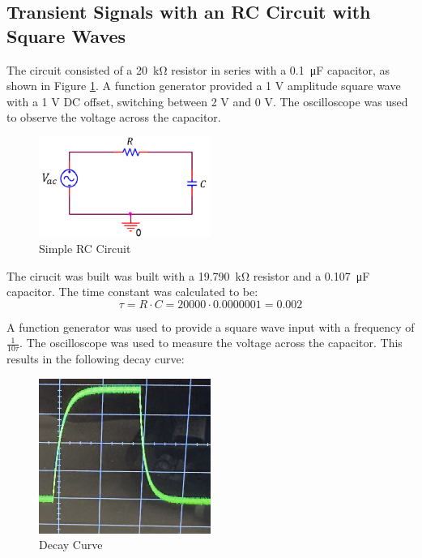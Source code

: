 \documentclass[12pt]{article}
\begin{document}
\subsection{Transient Signals with an RC Circuit with Square Waves} \label{subsec:part 1}
The circuit consisted of a \SI{20}{\kilo\ohm} resistor in series with a \SI{0.1}{\micro\farad} capacitor, as
shown in Figure \ref{fig:simpleRCCircuit}. A function generator provided a 1 V amplitude square wave
with a 1 V DC offset, switching between 2 V and 0 V. The oscilloscope was used
to observe the voltage across the capacitor.

\begin{figure}[H]
	\centering
	\includegraphics[width=0.5\textwidth]{SimpleRCCircuit.png}
	\caption{Simple RC Circuit}
	\label{fig:simpleRCCircuit}
\end{figure}

The cirucit was built was built with a \SI{19.790}{\kilo\ohm} resistor 
and a \SI{0.107}{\micro\farad} capacitor. The time constant was 
calculated to be:
\[
\tau = R \cdot C = 20000 \cdot 0.0000001 = 0.002
\]

A function generator was used to provide a square wave input with a frequency of $\frac{1}{10 \tau}$.
The oscilloscope was used to measure the voltage across the 
capacitor. This results in the following decay curve:

\begin{figure}[H]
	\centering
	\includegraphics[width=0.5\textwidth]{decayfunction.png}
	\caption{Decay Curve}
	\label{fig:decayCurve}
\end{figure}
\end{document}
